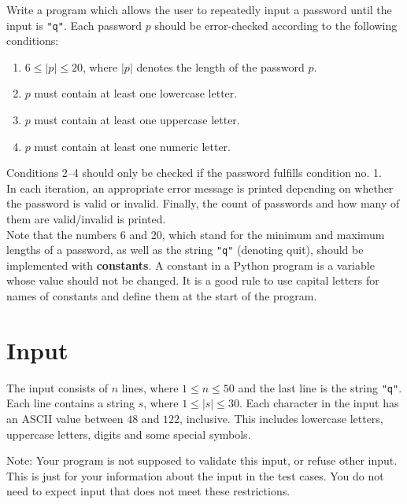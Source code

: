 
Write a program which allows the user to repeatedly input a password until the input is \texttt{"q"}.
Each password $p$ should be error-checked according to the following conditions: 
\begin{enumerate} 
    \item $6 \le |p| \le 20$, where $|p|$ denotes the length of the password $p$.
    \item $p$ must contain at least one lowercase letter.
    \item $p$ must contain at least one uppercase letter.
    \item $p$ must contain at least one numeric letter.
\end{enumerate}

Conditions 2--4 should only be checked if the password fulfills condition no. 1. \\

In each iteration, an appropriate error message is printed depending on whether the password is valid or invalid.
Finally, the count of passwords and how many of them are valid/invalid is printed. \\

Note that the numbers 6 and 20, which stand for the minimum and maximum lengths of a password, as well as the string \texttt{"q"} (denoting quit), should be implemented with \textbf{constants}.
A constant in a Python program is a variable whose value should not be changed.
It is a good rule to use capital letters for names of constants and define them at the start of the program.

\section*{Input}
The input consists of $n$ lines, where $1 \le n \le 50$ and the last line is the string \texttt{"q"}.
Each line contains a string $s$, where $1 \le |s| \le 30$.
Each character in the input has an ASCII value between $48$ and $122$, inclusive.
This includes lowercase letters, uppercase letters, digits and some special symbols.

Note: Your program is not supposed to validate this input, or refuse other input.
This is just for your information about the input in the test cases. 
You do not need to expect input that does not meet these restrictions.

